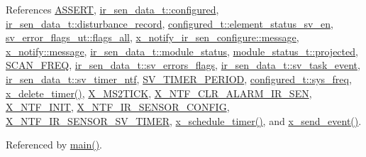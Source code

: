 References \hyperlink{a00072_source_l00059}{A\+S\+S\+E\+R\+T}, \hyperlink{a00023_source_l00040}{ir\+\_\+sen\+\_\+data\+\_\+t\+::configured}, \hyperlink{a00023_source_l00045}{ir\+\_\+sen\+\_\+data\+\_\+t\+::disturbance\+\_\+record}, \hyperlink{a00021_source_l00205}{configured\+\_\+t\+::element\+\_\+status\+\_\+sv\+\_\+en}, \hyperlink{a00022_source_l00044}{sv\+\_\+error\+\_\+flags\+\_\+ut\+::flags\+\_\+all}, \hyperlink{a00017_a466ed85f7086376a698e191f74f9a0bc}{x\+\_\+notify\+\_\+ir\+\_\+sen\+\_\+configure\+::message}, \hyperlink{a00036_source_l00075}{x\+\_\+notify\+::message}, \hyperlink{a00023_source_l00049}{ir\+\_\+sen\+\_\+data\+\_\+t\+::module\+\_\+status}, \hyperlink{a00017_a6b2516d74583418cec324c50041421c9}{module\+\_\+status\+\_\+t\+::projected}, \hyperlink{a00021_source_l00096}{S\+C\+A\+N\+\_\+\+F\+R\+E\+Q}, \hyperlink{a00023_source_l00056}{ir\+\_\+sen\+\_\+data\+\_\+t\+::sv\+\_\+errors\+\_\+flags}, \hyperlink{a00023_source_l00033}{ir\+\_\+sen\+\_\+data\+\_\+t\+::sv\+\_\+task\+\_\+event}, \hyperlink{a00023_source_l00036}{ir\+\_\+sen\+\_\+data\+\_\+t\+::sv\+\_\+timer\+\_\+ntf}, \hyperlink{a00023_source_l00020}{S\+V\+\_\+\+T\+I\+M\+E\+R\+\_\+\+P\+E\+R\+I\+O\+D}, \hyperlink{a00021_source_l00192}{configured\+\_\+t\+::sys\+\_\+freq}, \hyperlink{a00037_source_l00482}{x\+\_\+delete\+\_\+timer()}, \hyperlink{a00036_source_l00048}{X\+\_\+\+M\+S2\+T\+I\+C\+K}, \hyperlink{a00021_source_l00171}{X\+\_\+\+N\+T\+F\+\_\+\+C\+L\+R\+\_\+\+A\+L\+A\+R\+M\+\_\+\+I\+R\+\_\+\+S\+E\+N}, \hyperlink{a00036_source_l00030}{X\+\_\+\+N\+T\+F\+\_\+\+I\+N\+I\+T}, \hyperlink{a00017_source_l00013}{X\+\_\+\+N\+T\+F\+\_\+\+I\+R\+\_\+\+S\+E\+N\+S\+O\+R\+\_\+\+C\+O\+N\+F\+I\+G}, \hyperlink{a00023_source_l00016}{X\+\_\+\+N\+T\+F\+\_\+\+I\+R\+\_\+\+S\+E\+N\+S\+O\+R\+\_\+\+S\+V\+\_\+\+T\+I\+M\+E\+R}, \hyperlink{a00037_source_l00456}{x\+\_\+schedule\+\_\+timer()}, and \hyperlink{a00037_source_l00381}{x\+\_\+send\+\_\+event()}.



Referenced by \hyperlink{a00048_source_l00080}{main()}.


